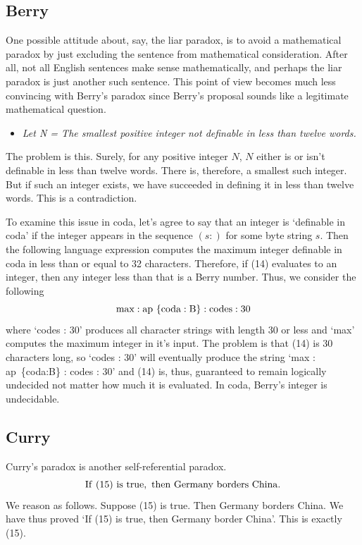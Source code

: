 \documentclass[11pt]{article}
\begin{document}
\subsection{Berry}

     One possible attitude about, say, the liar paradox, is to avoid a mathematical paradox by just excluding
the sentence  from mathematical consideration.  After all, not all English sentences make sense mathematically, and perhaps the liar paradox is just another such sentence.  
This point of view becomes much less convincing with Berry's paradox\cite{Berry} since Berry's proposal 
 sounds like a legitimate mathematical question.
 \begin{itemize}
 \item {\it Let N = The smallest positive integer not definable in less than twelve words.}
 \end{itemize}
The problem is this.  Surely, for any positive integer $N$, $N$ either is or isn't definable in less than twelve words.
There is, therefore, a smallest such integer.  But if such an integer exists, we have succeeded in defining it in
less than twelve words.  This is a contradiction.

    To examine this issue in coda, let's agree to say that an integer is `definable in coda' if the
integer appears in the sequence $(s:)$ for some byte string $s$.  Then the following language expression
computes the maximum integer definable in coda in less than or equal to 32 characters.  Therefore,
if (14) evaluates to an integer, then any integer less than that is a Berry number.
Thus, we consider the following
\begin{equation}
{\rm max : ap\ \{coda:B\} : codes : 30}
\end{equation}
where `codes : 30' produces all character strings with length 30 or less and `max' computes the maximum integer in it's input.
The problem is that (14) is 30 characters long, so `codes : 30' will eventually produce the string `{\rm max : ap\ \{coda:B\} : codes : 30}' and 
(14) is, thus, guaranteed to remain logically undecided not matter how much it is evaluated.   
In coda, Berry's integer is undecidable. 

\subsection{Curry}

Curry's paradox\cite{Curry} is another self-referential paradox.
\begin{equation}
{\rm If\ (15)\ is\ true,\ then\ Germany\ borders\ China.}
\end{equation}
We reason as follows.  Suppose (15) is true.  Then Germany borders China.  We have thus
proved `If (15) is true, then Germany border China'.  This is exactly (15).
\end{document}
